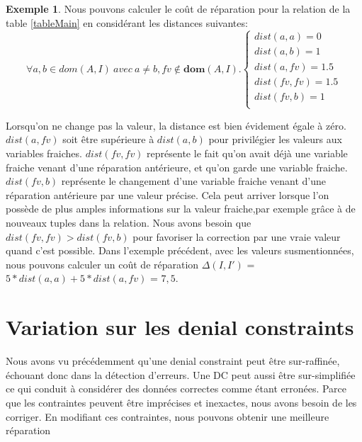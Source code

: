 \documentclass[letterpaper, 12pt]{report}
\theoremstyle{definition}
\newtheorem{myexample}{Exemple}
\newcommand{\dom}{\mathbf{dom}}
\begin{document}
\begin{myexample}
\label{exampleDist}
Nous pouvons calculer le coût de réparation pour la relation de la table \ref{tableMain} en considérant les distances suivantes:\\

$$
\forall a,b \in dom(A,I) \ avec \ a \neq b, fv \not\in\dom(A,I).
\left\{
	\begin{array}{ll}
	   dist(a,a)=0\\
	   dist(a,b)=1\\
	   dist(a,fv)=1.5\\
	   dist(fv,fv)=1.5\\
	   dist(fv,b)=1\\
	\end{array}
\right.
$$

Lorsqu'on ne change pas la valeur, la distance est bien évidement égale à zéro. $dist(a,fv)$ soit être supérieure à $dist(a,b)$ pour privilégier les valeurs aux variables fraiches. $dist(fv,fv)$ représente le fait qu'on avait déjà une variable fraiche venant d'une réparation antérieure, et qu'on garde une variable fraiche. $dist(fv,b)$ représente le changement d'une variable fraiche venant d'une réparation antérieure par une valeur précise. Cela peut arriver lorsque l'on possède de plus amples informations sur la valeur fraiche,par exemple grâce à de nouveaux tuples dans la relation. Nous avons besoin que $dist(fv,fv) > dist(fv,b)$ pour favoriser la correction par une vraie valeur quand c'est possible. Dans l'exemple précédent, avec les valeurs susmentionnées, nous pouvons calculer un coût de réparation $\Delta(I,I')$ =$5*dist(a,a) + 5*dist(a,fv)$ = $7,5$.
\end {myexample}

\section{Variation sur les denial constraints}

Nous avons vu précédemment qu'une denial constraint peut être sur-raffinée, échouant donc dans la détection d'erreurs. Une DC peut aussi être sur-simplifiée ce qui conduit à considérer des données correctes comme étant erronées. Parce que les contraintes peuvent être imprécises et inexactes, nous avons besoin de les corriger. En modifiant ces contraintes, nous pouvons obtenir une meilleure réparation\\
\end{document}
